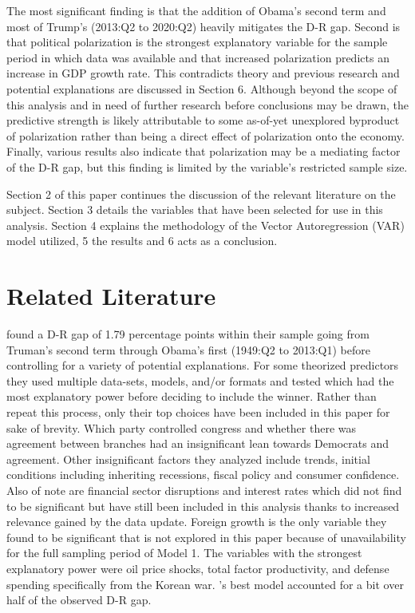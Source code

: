 \documentclass[a4paper, 12pt]{article}
\begin{document}
The most significant finding is that the addition of Obama's second term and most of Trump's (2013:Q2 to 2020:Q2) heavily mitigates the D-R gap. Second is that political polarization is the strongest explanatory variable for the sample period in which data was available and that increased polarization predicts an increase in GDP growth rate. This contradicts theory and previous research and potential explanations are discussed in Section 6. Although beyond the scope of this analysis and in need of further research before conclusions may be drawn, the predictive strength is likely attributable to some as-of-yet unexplored byproduct of polarization rather than being a direct effect of polarization onto the economy. Finally, various results also indicate that polarization may be a mediating factor of the D-R gap, but this finding is limited by the variable's restricted sample size. \par

Section 2 of this paper continues the discussion of the relevant literature on the subject. Section 3 details the variables that have been selected for use in this analysis. Section 4 explains the methodology of the Vector Autoregression (VAR) model utilized, 5 the results and 6 acts as a conclusion. 



\section{Related Literature}

 found a D-R gap of 1.79 percentage points within their sample going from Truman’s second term through Obama’s first (1949:Q2 to 2013:Q1) before controlling for a variety of potential explanations. For some theorized predictors they used multiple data-sets, models, and/or formats and tested which had the most explanatory power before deciding to include the winner. Rather than repeat this process, only their top choices have been included in this paper for sake of brevity. Which party controlled congress and whether there was agreement between branches had an insignificant lean towards Democrats and agreement. Other insignificant factors they analyzed include trends, initial conditions including inheriting recessions, fiscal policy and consumer confidence. Also of note are financial sector disruptions and interest rates which \citeauthor{blinderwatson2016} did not find to be significant but have still been included in this analysis thanks to increased relevance gained by the data update. Foreign growth is the only variable they found to be significant that is not explored in this paper because of unavailability for the full sampling period of Model 1. The variables with the strongest explanatory power were oil price shocks, total factor productivity, and defense spending specifically from the Korean war. \citeauthor{blinderwatson2016}'s best model accounted for a bit over half of the observed D-R gap. \par
\end{document}
